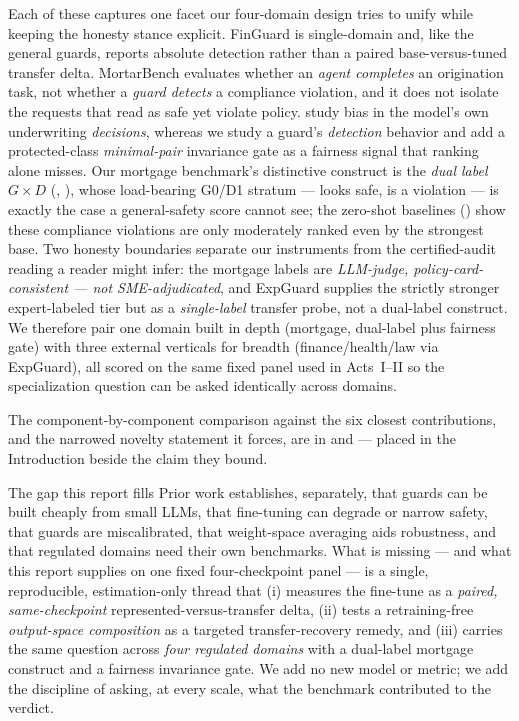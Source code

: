 Each of these captures one facet our four-domain design tries to unify while keeping the honesty stance
explicit. FinGuard is single-domain and, like the general guards, reports absolute detection rather than
a paired base-versus-tuned transfer delta. MortarBench evaluates whether an \emph{agent completes} an
origination task, not whether a \emph{guard detects} a compliance violation, and it does not isolate the
requests that read as safe yet violate policy. \citet{bowen2024mortgage} study bias in the model's own
underwriting \emph{decisions}, whereas we study a guard's \emph{detection} behavior and add a
protected-class \emph{minimal-pair} invariance gate as a fairness signal that ranking alone misses. Our
mortgage benchmark's distinctive construct is the \emph{dual label} $G\times D$ (,
), whose load-bearing G0/D1 stratum --- looks safe, is a violation --- is exactly the
case a general-safety score cannot see; the zero-shot baselines () show these
compliance violations are only moderately ranked even by the strongest base. Two honesty boundaries
separate our instruments from the certified-audit reading a reader might infer: the mortgage labels are
\emph{LLM-judge, policy-card-consistent --- not SME-adjudicated}, and ExpGuard supplies the strictly
stronger expert-labeled tier but as a \emph{single-label} transfer probe, not a dual-label construct. We
therefore pair one domain built in depth (mortgage, dual-label plus fairness gate) with three external
verticals for breadth (finance/health/law via ExpGuard), all scored on the same fixed panel used in
Acts~I--II so the specialization question can be asked identically across domains.

\noindent The component-by-component comparison against the six closest contributions, and the
narrowed novelty statement it forces, are in  and  ---
placed in the Introduction beside the claim they bound.

\begin{takeaway}{The gap this report fills}
Prior work establishes, separately, that guards can be built cheaply from small LLMs, that fine-tuning can
degrade or narrow safety, that guards are miscalibrated, that weight-space averaging aids robustness, and
that regulated domains need their own benchmarks. What is missing --- and what
this report supplies on one fixed four-checkpoint panel --- is a single, reproducible, estimation-only
thread that (i) measures the fine-tune as a \emph{paired, same-checkpoint} represented-versus-transfer
delta, (ii) tests a retraining-free \emph{output-space composition} as a targeted transfer-recovery
remedy, and (iii) carries the same question across \emph{four regulated domains} with a dual-label mortgage
construct and a fairness invariance gate. We add no new model or metric; we add the discipline of asking,
at every scale, what the benchmark contributed to the verdict.
\end{takeaway}
